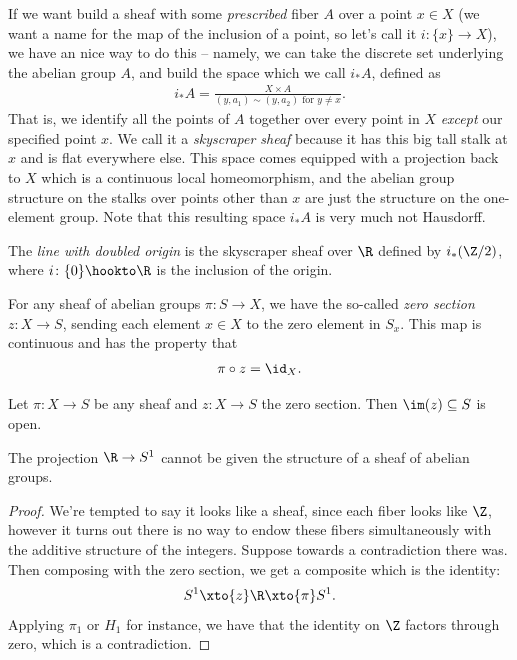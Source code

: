 \documentclass[11pt]{amsart}
\begin{document}
\begin{example}
\label{exa:skyscraper-sheaves}
If we want build a sheaf with some \emph{prescribed} fiber $A$ over a point $x\in X$ (we want a name for the map of the inclusion of a point, so let's call it $i \colon \{x\} \to X$), we have an nice way to do this -- namely, we can take the discrete set underlying the abelian group $A$, and build the space which we call $i_\ast A$, defined as
\begin{align*}
    i_\ast A = \frac{X \times A}{(y,a_1)\sim (y,a_2)\text{ for }y\ne x}.
\end{align*}
That is, we identify all the points of $A$ together over every point in $X$ \emph{except} our specified point $x$. We call it a \emph{skyscraper sheaf} because it has this big tall stalk at $x$ and is flat everywhere else. This space comes equipped with a projection back to $X$ which is a continuous local homeomorphism, and the abelian group structure on the stalks over points other than $x$ are just the structure on the one-element group. Note that this resulting space $i_\ast A$ is very much not Hausdorff.
\end{example}


\begin{example} The \emph{line with doubled origin} is the skyscraper sheaf over $\R$ defined by $i_\ast (\Z/2)$, where $i \colon \{0\}\hookto \R$ is the inclusion of the origin.
\end{example}


\begin{notation} For any sheaf of abelian groups $\pi \colon S \to X$, we have the so-called \emph{zero section} $z \colon X \to S$, sending each element $x\in X$ to the zero element in $S_x$. This map is continuous and has the property that
\begin{align*}
    \pi\circ z = \id_X.
\end{align*}
\end{notation}

\begin{exercise}\label{exer:image-zero-section-is-open}
Let $\pi \colon X \to S$ be any sheaf and $z \colon X \to S$ the zero section. Then $\im(z) \subseteq S$ is open.
\end{exercise}


\begin{example} The projection $\R \to S^1$ cannot be given the structure of a sheaf of abelian groups.
\end{example}
\begin{proof} We're tempted to say it looks like a sheaf, since each fiber looks like $\Z$, however it turns out there is no way to endow these fibers simultaneously with the additive structure of the integers. Suppose towards a contradiction there was. Then composing with the zero section, we get a composite which is the identity:
\begin{align*}
    S^1 \xto{z} \R \xto{\pi} S^1.
\end{align*}
Applying $\pi_1$ or $H_1$ for instance, we have that the identity on $\Z$ factors through zero, which is a contradiction.
\end{proof}
\end{document}
